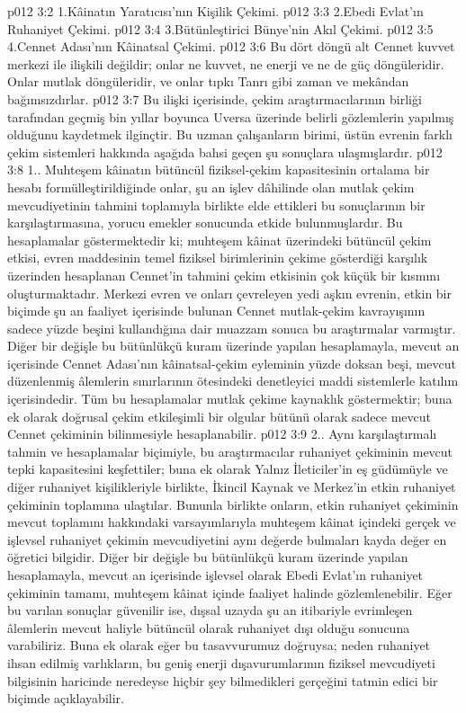 \vs p012 3:2 1.\bibnobreakspace Kâinatın Yaratıcısı’nın Kişilik Çekimi.
\vs p012 3:3 2.\bibnobreakspace Ebedi Evlat’ın Ruhaniyet Çekimi.
\vs p012 3:4 3.\bibnobreakspace Bütünleştirici Bünye’nin Akıl Çekimi.
\vs p012 3:5 4.\bibnobreakspace Cennet Adası’nın Kâinatsal Çekimi.
\vs p012 3:6 Bu dört döngü alt Cennet kuvvet merkezi ile ilişkili değildir; onlar ne kuvvet, ne enerji ve ne de güç döngüleridir. Onlar mutlak  döngüleridir, ve onlar tıpkı Tanrı gibi zaman ve mekândan bağımsızdırlar.
\vs p012 3:7 Bu ilişki içerisinde, çekim araştırmacılarının birliği tarafından geçmiş bin yıllar boyunca Uversa üzerinde belirli gözlemlerin yapılmış olduğunu kaydetmek ilginçtir. Bu uzman çalışanların birimi, üstün evrenin farklı çekim sistemleri hakkında aşağıda bahsi geçen şu sonuçlara ulaşmışlardır.
\vs p012 3:8 1.\bibnobreakspace {}. Muhteşem kâinatın bütüncül fiziksel\hyp{}çekim kapasitesinin ortalama bir hesabı formülleştirildiğinde onlar, şu an işlev dâhilinde olan mutlak çekim mevcudiyetinin tahmini toplamıyla birlikte elde ettikleri bu sonuçlarının bir karşılaştırmasına, yorucu emekler sonucunda etkide bulunmuşlardır. Bu hesaplamalar göstermektedir ki; muhteşem kâinat üzerindeki bütüncül çekim etkisi, evren maddesinin temel fiziksel birimlerinin çekime gösterdiği karşılık üzerinden hesaplanan Cennet’in tahmini çekim etkisinin çok küçük bir kısmını oluşturmaktadır. Merkezi evren ve onları çevreleyen yedi aşkın evrenin, etkin bir biçimde şu an faaliyet içerisinde bulunan Cennet mutlak\hyp{}çekim kavrayışının sadece yüzde beşini kullandığına dair muazzam sonuca bu araştırmalar varmıştır. Diğer bir değişle bu bütünlükçü kuram üzerinde yapılan hesaplamayla, mevcut an içerisinde Cennet Adası’nın kâinatsal\hyp{}çekim eyleminin yüzde doksan beşi, mevcut düzenlenmiş âlemlerin sınırlarının ötesindeki denetleyici maddi sistemlerle katılım içerisindedir. Tüm bu hesaplamalar mutlak çekime kaynaklık göstermektir; buna ek olarak doğrusal çekim etkileşimli bir olgular bütünü olarak sadece mevcut Cennet çekiminin bilinmesiyle hesaplanabilir.
\vs p012 3:9 2.\bibnobreakspace {}. Aynı karşılaştırmalı tahmin ve hesaplamalar biçimiyle, bu araştırmacılar ruhaniyet çekiminin mevcut tepki kapasitesini keşfettiler; buna ek olarak Yalnız İleticiler’in eş güdümüyle ve diğer ruhaniyet kişilikleriyle birlikte, İkincil Kaynak ve Merkez’in etkin ruhaniyet çekiminin toplamına ulaştılar. Bununla birlikte onların, etkin ruhaniyet çekiminin mevcut toplamını hakkındaki varsayımlarıyla muhteşem kâinat içindeki gerçek ve işlevsel ruhaniyet çekimin mevcudiyetini aynı değerde bulmaları kayda değer en öğretici bilgidir. Diğer bir değişle bu bütünlükçü kuram üzerinde yapılan hesaplamayla, mevcut an içerisinde işlevsel olarak Ebedi Evlat’ın ruhaniyet çekiminin tamamı, muhteşem kâinat içinde faaliyet halinde gözlemlenebilir. Eğer bu varılan sonuçlar güvenilir ise, dışsal uzayda şu an itibariyle evrimleşen âlemlerin mevcut haliyle bütüncül olarak ruhaniyet dışı olduğu sonucuna varabiliriz. Buna ek olarak eğer bu tasavvurumuz doğruysa; neden ruhaniyet ihsan edilmiş varlıkların, bu geniş enerji dışavurumlarının fiziksel mevcudiyeti bilgisinin haricinde neredeyse hiçbir şey bilmedikleri gerçeğini tatmin edici bir biçimde açıklayabilir.
